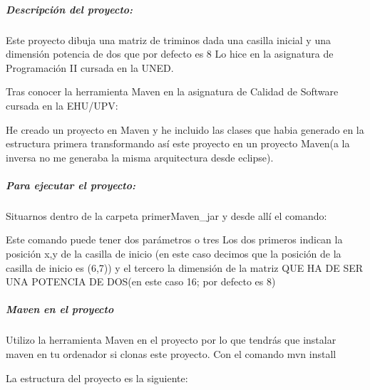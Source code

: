 \subparagraph*{Descripción del proyecto\+:}

Este proyecto dibuja una matriz de triminos dada una casilla inicial y una dimensión potencia de dos que por defecto es 8 Lo hice en la asignatura de Programación II cursada en la U\+N\+ED.

Tras conocer la herramienta Maven en la asignatura de Calidad de Software cursada en la E\+H\+U/\+U\+PV\+:


\begin{DoxyItemize}
\item He creado un proyecto en Maven y he incluido las clases que habia generado en la estructura primera transformando así este proyecto en un proyecto Maven(a la inversa no me generaba la misma arquitectura desde eclipse).
\end{DoxyItemize}

\subparagraph*{Para ejecutar el proyecto\+:}

Situarnos dentro de la carpeta primer\+Maven\+\_\+jar y desde allí el comando\+:


\begin{DoxyCode}{0}
\end{DoxyCode}
 Este comando puede tener dos parámetros o tres Los dos primeros indican la posición x,y de la casilla de inicio (en este caso decimos que la posición de la casilla de inicio es (6,7)) y el tercero la dimensión de la matriz Q\+UE HA DE S\+ER U\+NA P\+O\+T\+E\+N\+C\+IA DE D\+OS(en este caso 16; por defecto es 8)

\subparagraph*{Maven en el proyecto}

Utilizo la herramienta Maven en el proyecto por lo que tendrás que instalar maven en tu ordenador si clonas este proyecto. Con el comando mvn install

La estructura del proyecto es la siguiente\+:


